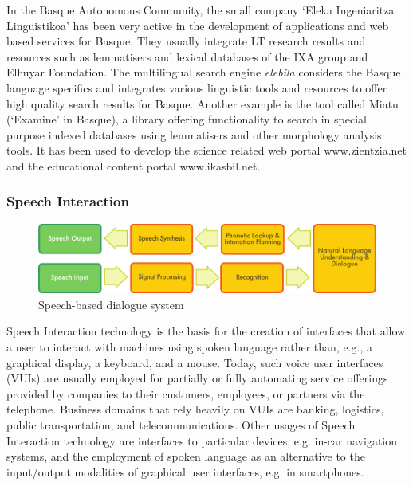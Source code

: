 \begin{multicols}{2}
In the Basque Autonomous Community, the small company ‘Eleka Ingeniaritza Linguistikoa’ has been very active in the development of applications and web based services for Basque. They usually integrate LT research results and resources such as lemmatisers and lexical databases of the IXA group and Elhuyar Foundation. The multilingual search engine \textit{elebila} considers the Basque language specifics and integrates various linguistic tools and resources to offer high quality search results for Basque. Another example is the tool called Miatu (‘Examine’ in Basque), a library offering functionality to search in special purpose indexed databases using lemmatisers and other morphology analysis tools. It has been used to develop the science related web portal www.zientzia.net and the educational content portal www.ikasbil.net.

\subsubsection{Speech Interaction}
\begin{figure}[htb]
  \center
  \includegraphics[width=\textwidth]{../_media/english/simple_speech-based_dialogue_architecture}
  \caption{Speech-based dialogue system}
  \label{fig:dialoguearch_en}
\end{figure}

Speech Interaction technology is the basis for the creation of interfaces that allow a user to interact with machines using spoken language rather than, e.g., a graphical display, a keyboard, and a mouse. Today, such voice user interfaces (VUIs) are usually employed for partially or fully automating service offerings provided by companies to their customers, employees, or partners via the telephone. Business domains that rely heavily on VUIs are banking, logistics, public transportation, and telecommunications. Other usages of Speech Interaction technology are interfaces to particular devices, e.g. in-car navigation systems, and the employment of spoken language as an alternative to the input/output modalities of graphical user interfaces, e.g. in smartphones.


\end{multicols}
